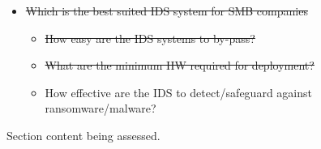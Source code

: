 \begin{notes}

    \begin{itemize}
        \item \sout{Which is the best suited IDS system for SMB companies}
        \begin{itemize}
            \item \sout{How easy are the IDS systems to by-pass?}
            \item \sout{What are the minimum HW required for deployment?}
            \item How effective are the IDS to detect/safeguard against ransomware/malware?
        \end{itemize}

    \end{itemize}
    
    
Section content being assessed.
    
\end{notes}